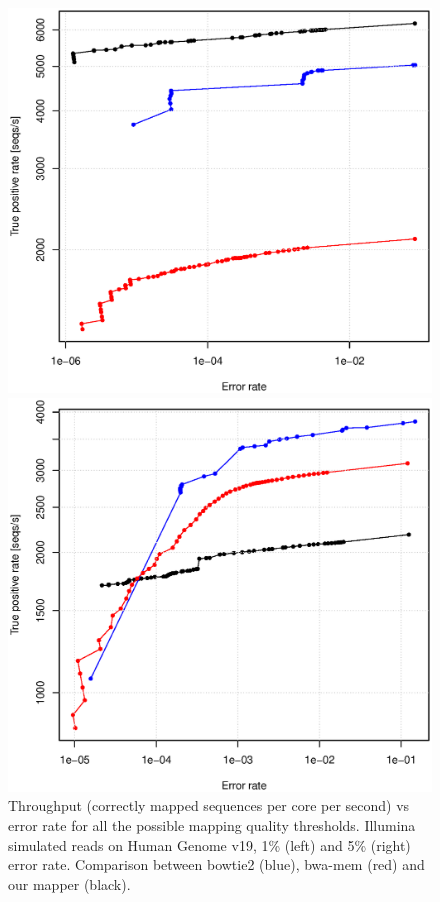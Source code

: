 \begin{figure}[h]
   \label{fig:chap4:hg-rate}
	\begin{minipage}[b]{0.5\linewidth}
	  \centering
	  \includegraphics[width=\textwidth]{figures/chap4_hg_1_15_throughput}
   \end{minipage}
	\begin{minipage}[b]{0.5\linewidth}
	  \centering
	  \includegraphics[width=\textwidth]{figures/chap4_hg_5_15_throughput}
   \end{minipage}
   \caption{Throughput (correctly mapped sequences per core per
       second) vs error rate for all the possible mapping quality
       thresholds. Illumina simulated reads on Human Genome v19, 1\%
       (left) and 5\% (right) error rate. Comparison between bowtie2
       (blue), bwa-mem (red) and our mapper (black). }
\end{figure}

